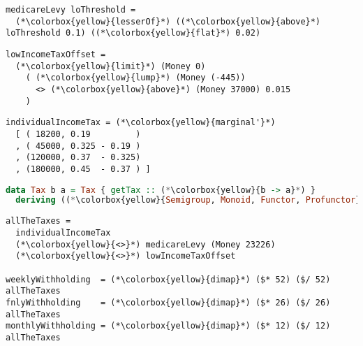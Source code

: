\documentclass[ignorenonframetext,aspectratio=169,12pt]{beamer}
\begin{document}
\begin{frame}[fragile]
\center

\begin{lstlisting}
medicareLevy loThreshold =
  (*\colorbox{yellow}{lesserOf}*) ((*\colorbox{yellow}{above}*) loThreshold 0.1) ((*\colorbox{yellow}{flat}*) 0.02)
\end{lstlisting}

\end{frame}

\begin{frame}[fragile]
\center

\begin{lstlisting}
lowIncomeTaxOffset =
  (*\colorbox{yellow}{limit}*) (Money 0)
    ( (*\colorbox{yellow}{lump}*) (Money (-445))
      <> (*\colorbox{yellow}{above}*) (Money 37000) 0.015
    )
\end{lstlisting}

\end{frame}

\begin{frame}[fragile]
\center

\begin{lstlisting}
individualIncomeTax = (*\colorbox{yellow}{marginal'}*)
  [ ( 18200, 0.19         )
  , ( 45000, 0.325 - 0.19 )
  , (120000, 0.37  - 0.325)
  , (180000, 0.45  - 0.37 ) ]
\end{lstlisting}

\end{frame}


\begin{frame}[fragile]
\center

\begin{lstlisting}[language=Haskell]
data Tax b a = Tax { getTax :: (*\colorbox{yellow}{b -> a}*) }
  deriving ((*\colorbox{yellow}{Semigroup, Monoid, Functor, Profunctor}*))
\end{lstlisting}

\end{frame}

\begin{frame}[fragile]
\center

\begin{lstlisting}
allTheTaxes =
  individualIncomeTax
  (*\colorbox{yellow}{<>}*) medicareLevy (Money 23226)
  (*\colorbox{yellow}{<>}*) lowIncomeTaxOffset

weeklyWithholding  = (*\colorbox{yellow}{dimap}*) ($* 52) ($/ 52) allTheTaxes
fnlyWithholding    = (*\colorbox{yellow}{dimap}*) ($* 26) ($/ 26) allTheTaxes
monthlyWithholding = (*\colorbox{yellow}{dimap}*) ($* 12) ($/ 12) allTheTaxes
\end{lstlisting}

\end{frame}
\end{document}
